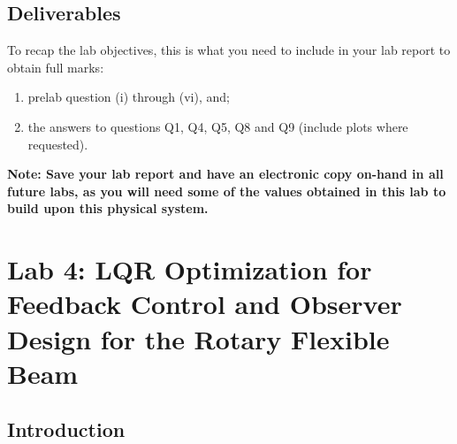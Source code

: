 \documentclass[12pt]{report}
\newcommand\drew[1]{\textcolor{red}{#1}}
\begin{document}

\subsection{Deliverables}
To recap the lab objectives, this is what you need to include in your lab report to obtain full marks:
\begin{enumerate}
    \item prelab question (i) through (vi), and;
    \item the answers to questions Q1, Q4, Q5, Q8 and Q9 (include plots where requested).
\end{enumerate}
\textbf{Note: Save your lab report and have an electronic copy on-hand in all future labs, as you will need some of the values obtained in this lab to build upon this physical system.}
\newpage
\section{Lab 4: LQR Optimization for Feedback Control and Observer Design for the Rotary Flexible Beam} \label{section:lab4}

\subsection{Introduction}\label{subsection:lab4_intro}
\end{document}
